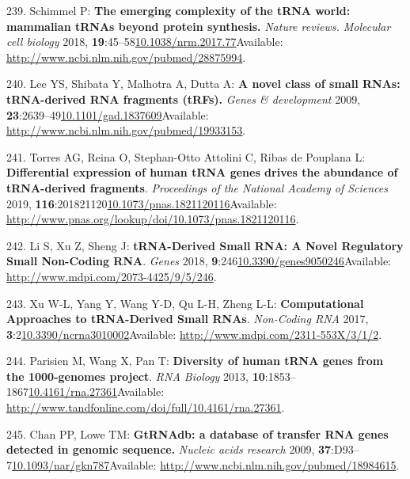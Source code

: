 \documentclass[
]{book}
\begin{document}
\leavevmode\hypertarget{ref-Schimmel2017}{}%
239. Schimmel P: \textbf{The emerging complexity of the tRNA world: mammalian tRNAs beyond protein synthesis.} \emph{Nature reviews. Molecular cell biology} 2018, \textbf{19}:45--58\href{https://doi.org/10.1038/nrm.2017.77}{10.1038/nrm.2017.77}Available: \url{http://www.ncbi.nlm.nih.gov/pubmed/28875994}.

\leavevmode\hypertarget{ref-Lee2009}{}%
240. Lee YS, Shibata Y, Malhotra A, Dutta A: \textbf{A novel class of small RNAs: tRNA-derived RNA fragments (tRFs).} \emph{Genes \& development} 2009, \textbf{23}:2639--49\href{https://doi.org/10.1101/gad.1837609}{10.1101/gad.1837609}Available: \url{http://www.ncbi.nlm.nih.gov/pubmed/19933153}.

\leavevmode\hypertarget{ref-Torres2019}{}%
241. Torres AG, Reina O, Stephan-Otto Attolini C, Ribas de Pouplana L: \textbf{Differential expression of human tRNA genes drives the abundance of tRNA-derived fragments}. \emph{Proceedings of the National Academy of Sciences} 2019, \textbf{116}:201821120\href{https://doi.org/10.1073/pnas.1821120116}{10.1073/pnas.1821120116}Available: \url{http://www.pnas.org/lookup/doi/10.1073/pnas.1821120116}.

\leavevmode\hypertarget{ref-Li2018a}{}%
242. Li S, Xu Z, Sheng J: \textbf{tRNA-Derived Small RNA: A Novel Regulatory Small Non-Coding RNA}. \emph{Genes} 2018, \textbf{9}:246\href{https://doi.org/10.3390/genes9050246}{10.3390/genes9050246}Available: \url{http://www.mdpi.com/2073-4425/9/5/246}.

\leavevmode\hypertarget{ref-Xu2017a}{}%
243. Xu W-L, Yang Y, Wang Y-D, Qu L-H, Zheng L-L: \textbf{Computational Approaches to tRNA-Derived Small RNAs}. \emph{Non-Coding RNA} 2017, \textbf{3}:2\href{https://doi.org/10.3390/ncrna3010002}{10.3390/ncrna3010002}Available: \url{http://www.mdpi.com/2311-553X/3/1/2}.

\leavevmode\hypertarget{ref-Parisien2013}{}%
244. Parisien M, Wang X, Pan T: \textbf{Diversity of human tRNA genes from the 1000-genomes project}. \emph{RNA Biology} 2013, \textbf{10}:1853--1867\href{https://doi.org/10.4161/rna.27361}{10.4161/rna.27361}Available: \url{http://www.tandfonline.com/doi/full/10.4161/rna.27361}.

\leavevmode\hypertarget{ref-Chan2009}{}%
245. Chan PP, Lowe TM: \textbf{GtRNAdb: a database of transfer RNA genes detected in genomic sequence.} \emph{Nucleic acids research} 2009, \textbf{37}:D93--7\href{https://doi.org/10.1093/nar/gkn787}{10.1093/nar/gkn787}Available: \url{http://www.ncbi.nlm.nih.gov/pubmed/18984615}.
\end{document}
